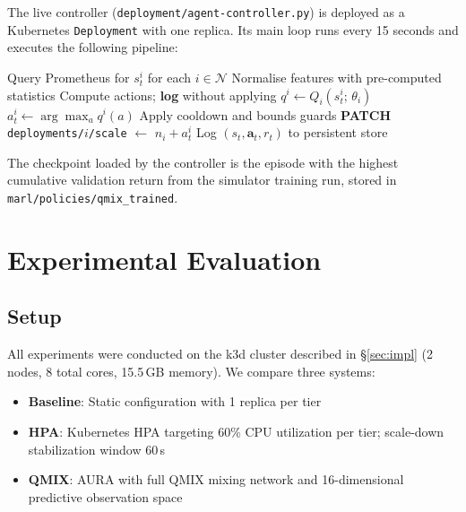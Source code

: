 \documentclass[conference]{IEEEtran}
\begin{document}
The live controller (\texttt{deployment/agent-controller.py}) is
deployed as a Kubernetes \texttt{Deployment} with one replica.
Its main loop runs every 15 seconds and executes the following
pipeline:

\begin{algorithm}[H]
\caption{AURA Control Loop (single tick)}
\label{alg:ctrl}
\begin{algorithmic}[1]
  \STATE Query Prometheus for $s_t^i$ for each $i \in \mathcal{N}$
  \STATE Normalise features with pre-computed statistics
    \STATE Compute actions; \textbf{log} without applying
  \ELSE
      \STATE $q^i \leftarrow Q_i(s_t^i;\,\theta_i)$
      \STATE $a_t^i \leftarrow \arg\max_{a} q^i(a)$
      \STATE Apply cooldown and bounds guards
      \STATE \textbf{PATCH} \texttt{deployments/$i$/scale}
             $\leftarrow$ $n_i + a_t^i$
    \ENDFOR
  \ENDIF
  \STATE Log $(s_t, \mathbf{a}_t, r_t)$ to persistent store
\end{algorithmic}
\end{algorithm}

The checkpoint loaded by the controller is the episode with the
highest cumulative validation return from the simulator training
run, stored in \texttt{marl/policies/qmix\_trained}.

\section{Experimental Evaluation}
\label{sec:eval}

\subsection{Setup}

All experiments were conducted on the k3d cluster described in
\S\ref{sec:impl} (2 nodes, 8 total cores, 15.5\,GB memory). We compare
three systems:
\begin{itemize}
  \item \textbf{Baseline}: Static configuration with 1 replica per tier
  \item \textbf{HPA}: Kubernetes HPA targeting 60\% CPU utilization
        per tier; scale-down stabilization window 60\,s
  \item \textbf{QMIX}: AURA with full QMIX mixing network and
        16-dimensional predictive observation space
\end{itemize}
\end{document}

